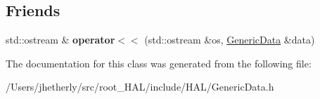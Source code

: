 \subsection*{Friends}
\begin{DoxyCompactItemize}
\item 
\hypertarget{class_h_a_l_1_1_generic_data_ad3342706941e18f58dc3a39a63ccfd7c}{std\-::ostream \& {\bfseries operator$<$$<$} (std\-::ostream \&os, \hyperlink{class_h_a_l_1_1_generic_data}{Generic\-Data} \&data)}\label{class_h_a_l_1_1_generic_data_ad3342706941e18f58dc3a39a63ccfd7c}

\end{DoxyCompactItemize}


The documentation for this class was generated from the following file\-:\begin{DoxyCompactItemize}
\item 
/\-Users/jhetherly/src/root\-\_\-\-H\-A\-L/include/\-H\-A\-L/Generic\-Data.\-h\end{DoxyCompactItemize}
